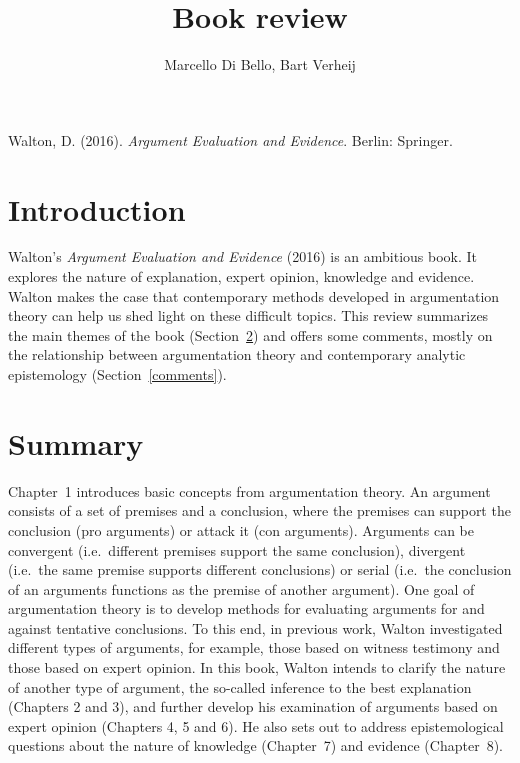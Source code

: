 \documentclass[12pt,a4paper]{article}
\begin{document}
\title{Book review}

\author{}
\author{Marcello Di Bello, Bart Verheij}

\date{}

\maketitle


Walton, D. (2016). \emph{Argument Evaluation and Evidence}. Berlin: Springer.

\section{Introduction}

\noindent Walton's \emph{Argument Evaluation and Evidence} (2016) is an ambitious book. It explores the nature of explanation,
expert opinion, knowledge and evidence. Walton makes the case that
contemporary methods developed in argumentation theory can help us shed light on these difficult topics.
This review summarizes the main themes of the book (Section~\ref{summary}) and offers some comments, 
mostly on the relationship between argumentation theory and contemporary analytic epistemology (Section~\ref{comments}).

\section{Summary}
\label{summary}
\noindent Chapter~1 introduces basic concepts from argumentation
theory. An argument consists of a set of premises and a conclusion,
where the premises can support the conclusion (pro arguments) or attack
it (con arguments). Arguments can be convergent (i.e.\ different
premises support the same conclusion), divergent (i.e.\ the same
premise supports different conclusions) or serial (i.e.\ the conclusion
of an arguments functions as the premise of another argument).
One goal of argumentation theory is to develop methods for evaluating 
arguments for and against tentative conclusions. To this end, in previous work,
Walton investigated different types of arguments, for example, those
based on witness testimony and those based on expert opinion. In this
book, Walton intends to clarify the nature of another type of
argument, the so-called inference to the best explanation (Chapters 2
and 3), and further develop his examination of arguments based on
expert opinion (Chapters 4, 5 and  6). He also sets out to
address epistemological questions about the nature of knowledge
(Chapter~7) and evidence (Chapter~8).
\end{document}
